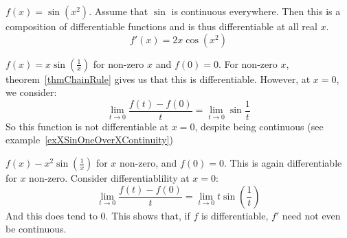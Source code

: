 \documentclass[../Main.tex]{subfiles}
\begin{document}
\begin{examples}{}
    \item $f(x) = \sin{(x^2)}$. Assume that $\sin$ is continuous everywhere. Then this is a composition of differentiable functions and is thus differentiable at all real $x$.
        \begin{equation*}
            f'(x) = 2x\cos{(x^2)}
        \end{equation*}
    \item $f(x) = x\sin{\left(\frac{1}{x}\right)}$ for non-zero $x$ and $f(0) = 0$. For non-zero $x$, theorem~\ref{thmChainRule} gives us that this is differentiable. However, at $x = 0$, we consider:
        \begin{equation*}
            \lim_{t \to 0} \frac{f(t) - f(0)}{t} = \lim_{t \to 0} \sin{\frac{1}{t}}
        \end{equation*}
        So this function is not differentiable at $x = 0$, despite being continuous (see example~\ref{exXSinOneOverXContinuity})
    \item $f(x) - x^2 \sin{\left(\frac{1}{x}\right)}$ for $x$ non-zero, and $f(0) = 0$. This is again differentiable for $x$ non-zero. Consider differentiablility at $x = 0$:
        \begin{equation*}
            \lim_{t \to 0} \frac{f(t) - f(0)}{t} = \lim_{t \to 0}  t \sin{\left(\frac{1}{t}\right)}
        \end{equation*}
        And this does tend to 0. This shows that, if $f$ is differentiable, $f'$ need not even be continuous.
\end{examples}
\end{document}
